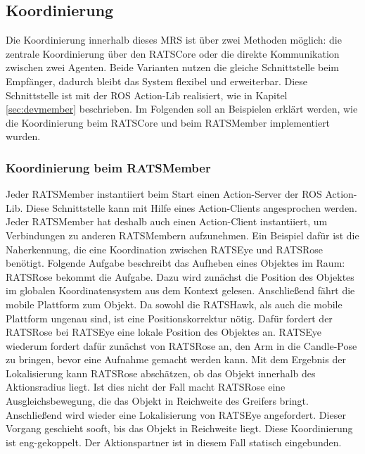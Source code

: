 \subsection{Koordinierung}
Die Koordinierung innerhalb dieses MRS ist über zwei Methoden möglich: die zentrale Koordinierung über den RATSCore oder die direkte Kommunikation zwischen zwei Agenten. Beide Varianten nutzen die gleiche Schnittstelle beim Empfänger, dadurch bleibt das System flexibel und erweiterbar. Diese Schnittstelle ist mit der ROS Action-Lib realisiert, wie in Kapitel \ref{sec:devmember} beschrieben. Im Folgenden soll an Beispielen erklärt werden, wie die Koordinierung beim RATSCore und beim RATSMember implementiert wurden.

\subsubsection{Koordinierung beim RATSMember}
Jeder RATSMember instantiiert beim Start einen Action-Server der ROS Action-Lib. Diese Schnittstelle kann mit Hilfe eines Action-Clients angesprochen werden. Jeder RATSMember hat deshalb auch einen Action-Client instantiiert, um Verbindungen zu anderen RATSMembern aufzunehmen. Ein Beispiel dafür ist die Naherkennung, die eine Koordination zwischen RATSEye und RATSRose benötigt. Folgende Aufgabe beschreibt das Aufheben eines Objektes im Raum: RATSRose bekommt die Aufgabe. Dazu wird zunächst die Position des Objektes im globalen Koordinatensystem aus dem Kontext gelesen. Anschließend fährt die mobile Plattform zum Objekt. Da sowohl die RATSHawk, als auch die mobile Plattform ungenau sind, ist eine Positionskorrektur nötig. Dafür fordert der RATSRose bei RATSEye eine lokale Position des Objektes an. RATSEye wiederum fordert dafür zunächst von RATSRose an, den Arm in die Candle-Pose zu bringen, bevor eine Aufnahme gemacht werden kann. Mit dem Ergebnis der Lokalisierung kann RATSRose abschätzen, ob das Objekt innerhalb des Aktionsradius liegt. Ist dies nicht der Fall macht RATSRose eine Ausgleichsbewegung, die das Objekt in Reichweite des Greifers bringt. Anschließend wird wieder eine Lokalisierung von RATSEye angefordert. Dieser Vorgang geschieht sooft, bis das Objekt in Reichweite liegt. Diese Koordinierung ist eng-gekoppelt. Der Aktionspartner ist in diesem Fall statisch eingebunden.

